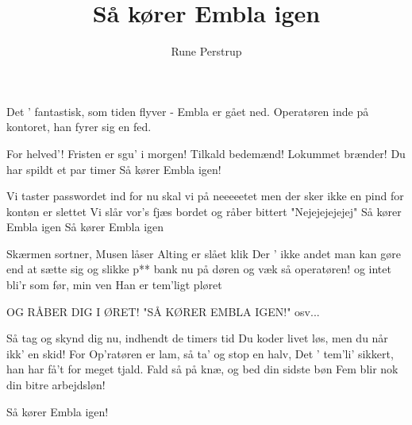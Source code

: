 \documentclass[a4paper,11pt]{article}
\title{Så kører Embla igen}
\author{Rune Perstrup}
\begin{document}
\twocolumn[
\maketitle
]

\begin{song} 
{}
Det ' fantastisk,
som tiden flyver
- Embla er gået ned.
Operatøren
inde på kontoret,
han fyrer sig en fed.

{}
For helved'! Fristen
er sgu' i morgen!
Tilkald bedemænd!
Lokummet brænder!
Du har spildt et par timer
Så kører Embla igen!

Vi taster passwordet ind
for nu skal vi på neeeeetet
men der sker ikke en pind
for kontøn er slettet
Vi slår vor's fjæs bordet
og råber bittert "Nejejejejejej"
Så kører Embla igen
Så kører Embla igen

{}
Skærmen sortner,
Musen låser
Alting er slået klik
Der ' ikke andet
man kan gøre
end at sætte sig og slikke p**
bank nu på døren
og væk så operatøren!
og intet bli'r som før, min ven
Han er tem'ligt pløret

{}
OG RÅBER DIG I ØRET!
"SÅ KØRER EMBLA IGEN!"
osv...

Så tag og skynd dig nu, indhendt de timers tid
Du koder livet løs, men du når ikk' en skid!
For Op'ratøren er lam, så ta' og stop en halv,
Det ' tem'li' sikkert, han har få't for meget tjald.
Fald så på knæ, og bed din sidste bøn
Fem blir nok din bitre arbejdsløn!

Så kører Embla igen!

\end{song}
\end{document}
